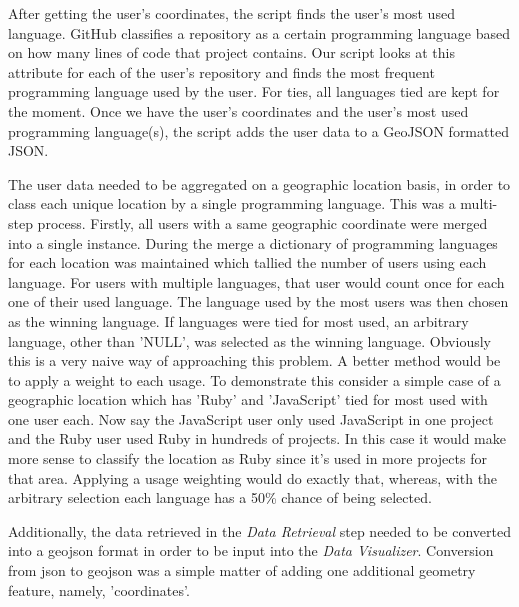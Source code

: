 \documentclass[11pt]{article}
\begin{document}
After getting the user’s coordinates, the script finds the user’s most used language. GitHub classifies a repository as a certain programming language based on how many lines of code that project contains. Our script looks at this attribute for each of the user’s repository and finds the most frequent programming language used by the user. For ties, all languages tied are kept for the moment. Once we have the user’s coordinates and the user’s most used programming language(s), the script adds the user data to a GeoJSON formatted JSON.

The user data needed to be aggregated on a geographic location basis, in order to class each unique location by a single programming language. This was a multi-step process. Firstly, all users with a same geographic coordinate were merged into a single instance. During the merge a dictionary of programming languages for each location was maintained which tallied the number of users using each language. For users with multiple languages, that user would count once for each one of their used language. The language used by the most users was then chosen as the winning language. If languages were tied for most used, an arbitrary language, other than 'NULL', was selected as the winning language. Obviously this is a very naive way of approaching this problem. A better method would be to apply a weight to each usage. To demonstrate this consider a simple case of a geographic location which has 'Ruby' and 'JavaScript' tied for most used with one user each. Now say the JavaScript user only used JavaScript in one project and the Ruby user used Ruby in hundreds of projects. In this case it would make more sense to classify the location as Ruby since it's used in more projects for that area. Applying a usage weighting would do exactly that, whereas, with the arbitrary selection each language has a 50\% chance of being selected.

Additionally, the data retrieved in the \textit{Data Retrieval} step needed to be converted into a geojson format in order to be input into the \textit{Data Visualizer}. Conversion from json to geojson was a simple matter of adding one additional geometry feature, namely, 'coordinates'.
\end{document}
